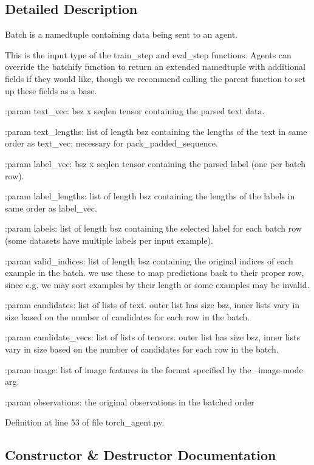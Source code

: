\subsection{Detailed Description}
\begin{DoxyVerb}Batch is a namedtuple containing data being sent to an agent.

This is the input type of the train_step and eval_step functions.
Agents can override the batchify function to return an extended namedtuple
with additional fields if they would like, though we recommend calling the
parent function to set up these fields as a base.

:param text_vec:
    bsz x seqlen tensor containing the parsed text data.

:param text_lengths:
    list of length bsz containing the lengths of the text in same order as
    text_vec; necessary for pack_padded_sequence.

:param label_vec:
    bsz x seqlen tensor containing the parsed label (one per batch row).

:param label_lengths:
    list of length bsz containing the lengths of the labels in same order as
    label_vec.

:param labels:
    list of length bsz containing the selected label for each batch row (some
    datasets have multiple labels per input example).

:param valid_indices:
    list of length bsz containing the original indices of each example in the
    batch. we use these to map predictions back to their proper row, since e.g.
    we may sort examples by their length or some examples may be invalid.

:param candidates:
    list of lists of text. outer list has size bsz, inner lists vary in size
    based on the number of candidates for each row in the batch.

:param candidate_vecs:
    list of lists of tensors. outer list has size bsz, inner lists vary in size
    based on the number of candidates for each row in the batch.

:param image:
    list of image features in the format specified by the --image-mode arg.

:param observations:
    the original observations in the batched order
\end{DoxyVerb}
 

Definition at line 53 of file torch\+\_\+agent.\+py.



\subsection{Constructor \& Destructor Documentation}
\mbox{\label{classparlai_1_1core_1_1torch__agent_1_1Batch_a6ef9b406e741e455da515aa8f84c798e}} 
